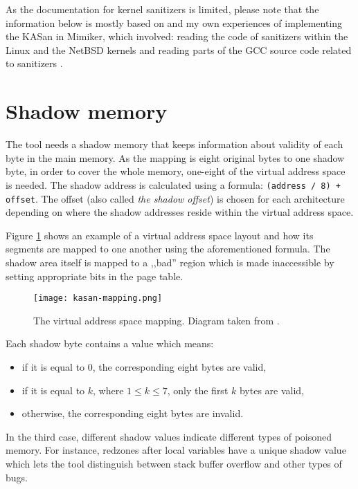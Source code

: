 \documentclass[shortabstract, manyadvisors, english, mgr]{iithesis}
\theoremstyle{definition} \newtheorem*{definition}{Definicja}
\theoremstyle{definition} \newtheorem*{example}{Przykład}
\theoremstyle{definition} \newtheorem*{remark}{Uwaga}
\begin{document}
As the documentation for kernel sanitizers is limited, please note that the information below is mostly based on \cite{bib:asan-paper} and my own experiences of implementing the KASan in Mimiker, which involved: reading the code of sanitizers within the Linux \cite{bib:linux-kasan-code} and the NetBSD \cite{bib:netbsd-kasan-code} kernels and reading parts of the GCC source code related to sanitizers \cite{bib:gcc-kasan-code}.

\section{Shadow memory}
The tool needs a shadow memory that keeps information about validity of each byte in the main memory. As the mapping is eight original bytes to one shadow byte, in order to cover the whole memory, one-eight of the virtual address space is needed. The shadow address is calculated using a formula: \texttt{(address / 8) + offset}. The offset (also called \textit{the shadow offset}) is chosen for each architecture depending on where the shadow addresses reside within the virtual address space.

Figure \ref{lbl:kasan-mapping} shows an example of a virtual address space layout and how its segments are mapped to one another using the aforementioned formula. The shadow area itself is mapped to a ,,bad'' region which is made inaccessible by setting appropriate bits in the page table.

\begin{figure}[h]
\label{lbl:kasan-mapping}
\centering
\texttt{[image: kasan-mapping.png]}
\caption{The virtual address space mapping. Diagram taken from \cite{bib:asan-paper}.}
\end{figure}

Each shadow byte contains a value which means:
\begin{itemize}
    \item if it is equal to 0, the corresponding eight bytes are valid,
    \item if it is equal to $k$, where $1 \leq k \leq 7$, only the first $k$ bytes are valid,
    \item otherwise, the corresponding eight bytes are invalid.
\end{itemize}
In the third case, different shadow values indicate different types of poisoned memory. For instance, redzones after local variables have a unique shadow value which lets the tool distinguish between stack buffer overflow and other types of bugs.
\end{document}
